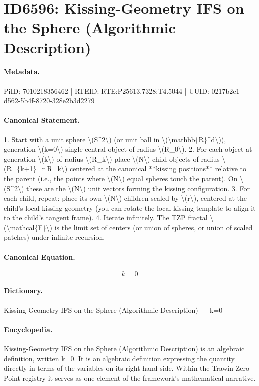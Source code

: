 \section*{ID6596: Kissing-Geometry IFS on the Sphere (Algorithmic Description)}
\paragraph{Metadata.}
PiID: 7010218356462 | RTEID: RTE:P25613.7328:T4.5044 | UUID: 0217b2c1-d562-5b4f-8720-328e2b3d2279

\paragraph{Canonical Statement.}
1. Start with a unit sphere \textbackslash{}(S\textasciicircum{}2\textbackslash{}) (or unit ball in \textbackslash{}(\textbackslash{}mathbb\{R\}\textasciicircum{}d\textbackslash{})), generation \textbackslash{}(k=0\textbackslash{}) single central object of radius \textbackslash{}(R\_0\textbackslash{}). 2. For each object at generation \textbackslash{}(k\textbackslash{}) of radius \textbackslash{}(R\_k\textbackslash{}) place \textbackslash{}(N\textbackslash{}) child objects of radius \textbackslash{}(R\_\{k+1\}=r R\_k\textbackslash{}) centered at the canonical **kissing positions** relative to the parent (i.e., the points where \textbackslash{}(N\textbackslash{}) equal spheres touch the parent). On \textbackslash{}(S\textasciicircum{}2\textbackslash{}) these are the \textbackslash{}(N\textbackslash{}) unit vectors forming the kissing configuration. 3. For each child, repeat: place its own \textbackslash{}(N\textbackslash{}) children scaled by \textbackslash{}(r\textbackslash{}), centered at the child’s local kissing geometry (you can rotate the local kissing template to align it to the child’s tangent frame). 4. Iterate infinitely. The TZP fractal \textbackslash{}(\textbackslash{}mathcal\{F\}\textbackslash{}) is the limit set of centers (or union of spheres, or union of scaled patches) under infinite recursion.

\paragraph{Canonical Equation.}
\[
k=0
\]

\paragraph{Dictionary.}
Kissing-Geometry IFS on the Sphere (Algorithmic Description) — k=0

\paragraph{Encyclopedia.}
Kissing-Geometry IFS on the Sphere (Algorithmic Description) is an algebraic definition, written k=0. It is an algebraic definition expressing the quantity directly in terms of the variables on its right-hand side. Within the Trawin Zero Point registry it serves as one element of the framework's mathematical narrative.
